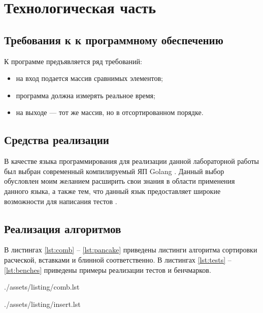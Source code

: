 \chapter{Технологическая часть}

\section{Требования к к программному обеспечению}

К программе предъявляется ряд требований:
\begin{itemize}[label=---]
	\item на вход подается массив сравнимых элементов;
	\item программа должна измерять реальное время;
	\item на выходе --- тот же массив, но в отсортированном порядке.
\end{itemize}

\section{Средства реализации}

В качестве языка программирования для реализации данной лабораторной работы был выбран современный компилируемый ЯП Golang \cite{golang}.
Данный выбор обусловлен моим желанием расширить свои знания в области применения данного языка, а также тем, что данный язык предоставляет широкие возможности для написания тестов \cite{gotest}.

\section{Реализация алгоритмов}

В листингах \ref{lst:comb} -- \ref{lst:pancake} приведены листинги алгоритма сортировки расческой, вставками и блинной соответственно.
В листингах \ref{lst:tests} -- \ref{lst:benches} приведены примеры реализации тестов и бенчмарков.

\clearpage
\begin{lstinputlisting}[
	caption={Алгоритм сортировки расческой},
	label={lst:comb},
	style={golang}
]{./assets/listing/comb.lst}
\end{lstinputlisting}

\begin{lstinputlisting}[
	caption={Алгоритм сортировки вставками},
	label={lst:insert},
	style={golang}
]{./assets/listing/insert.lst}
\end{lstinputlisting}

